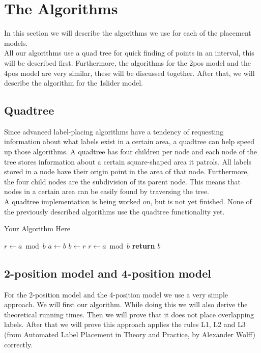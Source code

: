 \documentclass[crop=false,a4paper,oneside,11pt]{article}
\begin{document}
\section{The Algorithms}
In this section we will describe the algorithms we use for each of the placement models.\\
All our algorithms use a quad tree for quick finding of points in an interval, this will be described first. Furthermore, the algorithms for the 2pos model and the 4pos model are very similar, these will be discussed together. After that, we will describe the algorithm for the 1slider model.

\subsection{Quadtree}
Since advanced label-placing algorithms have a tendency of requesting information about what labels exist in a certain area, a quadtree can help speed up those algorithms. A quadtree has four children per node and each node of the tree stores information about a certain square-shaped area it patrols. All labels stored in a node have their origin point in the area of that node. Furthermore, the four child nodes are the subdivision of its parent node. This means that nodes in a certain area can be easily found by traversing the tree.\\
A quadtree implementation is being worked on, but is not yet finished. None of the previously described algorithms use the quadtree functionality yet.

\begin{algorithm}[H]
\caption{Your Algorithm Here}
\begin{algorithmic}[1]
\State $r\gets a\bmod b$
\State $a\gets b$
\State $b\gets r$
\State $r\gets a\bmod b$
\EndWhile
\State \textbf{return} $b$
\EndProcedure
\end{algorithmic}
\end{algorithm}


\subsection{2-position model and 4-position model}
For the 2-position model and the 4-position model we use a very simple approach. We will first our algorithm. While doing this we will also derive the theoretical running times. Then we will prove that it does not place overlapping labels. After that we will prove this approach applies the rules L1, L2 and L3 (from Automated Label Placement in Theory and Practice, by Alexander Wolff) correctly.
\end{document}
